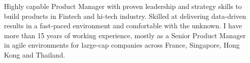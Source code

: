 

\begin{cvparagraph}


Highly capable Product Manager with proven leadership and strategy skills to build products in Fintech and hi-tech industry. Skilled at delivering data-driven results in a fast-paced environment and comfortable with the unknown. I have more than 15 years of working experience, mostly as a Senior Product Manager in agile environments for large-cap companies across France, Singapore, Hong Kong and Thailand.


\end{cvparagraph}

